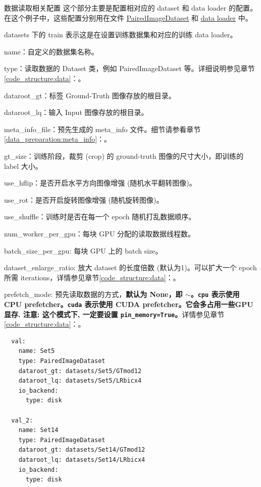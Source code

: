 \documentclass[../main.tex]{subfiles}
\begin{document}
\begin{exampleBox}[righthand ratio=0.00, sidebyside, sidebyside align=center, lower separated=false]{数据读取相关配置}
这个部分主要是配置相对应的 dataset 和 data loader 的配置。在这个例子中，这些配置分别用在文件 \href{https://github.com/XPixelGroup/BasicSR/blob/master/basicsr/data/paired_image_dataset.py}{PairedImageDataset} 和 \href{https://github.com/XPixelGroup/BasicSR/blob/master/basicsr/data/__init__.py}{data loader} 中。

datasets 下的 train 表示这是在设置训练数据集和对应的训练 data loader。

name：自定义的数据集名称。

type：读取数据的 Dataset 类，例如 PairedImageDataset 等。详细说明参见章节\ref{code_structure:data}：。

dataroot\_gt：标签 Ground-Truth 图像存放的根目录。

dataroot\_lq：输入 Input 图像存放的根目录。

meta\_info\_file：预先生成的 meta\_info 文件。细节请参看章节\ref{data_preparation:meta_info}：。

gt\_size：训练阶段，裁剪 (crop) 的 ground-truth 图像的尺寸大小，即训练的 label 大小。

use\_hflip：是否开启水平方向图像增强 (随机水平翻转图像)。

use\_rot：是否开启旋转图像增强 (随机旋转图像)。

use\_shuffle：训练时是否在每一个 epoch 随机打乱数据顺序。

num\_worker\_per\_gpu：每块 GPU 分配的读取数据线程数。

batch\_size\_per\_gpu: 每块 GPU 上的 batch size。

dataset\_enlarge\_ratio: 放大 dataset 的长度倍数 (默认为1)。可以扩大一个 epoch 所需 iterations，详情参见章节\ref{code_structure:data}：。

prefetch\_mode: 预先读取数据的方式，\textbf{默认为 None，即 $\sim$。\texttt{cpu} 表示使用 CPU prefetcher。\texttt{cuda} 表示使用 CUDA prefetcher。它会多占用一些GPU显存. 注意: 这个模式下, 一定要设置 \texttt{pin\_memory=True}。}详情参见章节\ref{code_structure:data}：。
\end{exampleBox}

\begin{verbatim}
  val:
    name: Set5
    type: PairedImageDataset
    dataroot_gt: datasets/Set5/GTmod12
    dataroot_lq: datasets/Set5/LRbicx4
    io_backend:
      type: disk

  val_2:
    name: Set14
    type: PairedImageDataset
    dataroot_gt: datasets/Set14/GTmod12
    dataroot_lq: datasets/Set14/LRbicx4
    io_backend:
      type: disk
\end{verbatim}
\end{document}
